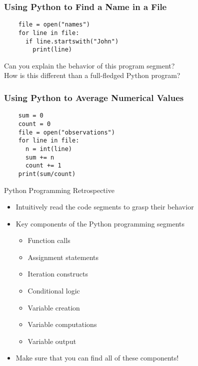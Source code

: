 \documentclass[14pt,aspectratio=169]{beamer}
\begin{document}
%
\begin{frame}[fragile]
  \frametitle{Using Python to Find a Name in a File}
  \normalsize
  \hspace*{-.65in}
  \begin{minipage}{6in}
    \begin{verbatim}
    file = open("names")
    for line in file:
      if line.startswith("John")
        print(line)
    \end{verbatim}
  \end{minipage}
  \vspace*{.25in}
  \begin{center}
    \normalsize \noindent Can you explain the behavior of this program segment? \\
    \normalsize \noindent How is this different than a full-fledged Python program? \\
  \end{center}
\end{frame}

%
\begin{frame}[fragile]
  \frametitle{Using Python to Average Numerical Values}
  \hspace*{-.6in}
  \begin{minipage}{6in}
    \begin{verbatim}
    sum = 0
    count = 0
    file = open("observations")
    for line in file:
      n = int(line)
      sum += n
      count += 1
    print(sum/count)
    \end{verbatim}
  \end{minipage}
\end{frame}

%
\begin{frame}{Python Programming Retrospective}
  \begin{itemize}
    \item Intuitively read the code segments to grasp their behavior
      \vspace*{-.15in}
    \item Key components of the Python programming segments
      \begin{itemize}
        \item Function calls
        \item Assignment statements
        \item Iteration constructs
        \item Conditional logic
        \item Variable creation
        \item Variable computations
        \item Variable output
      \end{itemize}
      \vspace*{-.2in}
    \item Make sure that you can find all of these components!
  \end{itemize}
\end{frame}
\end{document}
